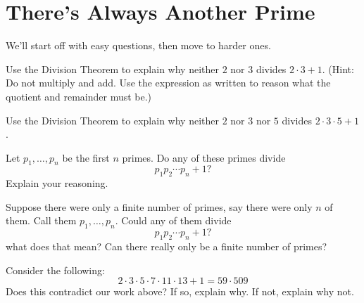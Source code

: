 \newpage
\section{There's Always Another Prime}\label{A:Pr}

We'll start off with easy questions, then move to harder ones.  

\begin{prob}
Use the Division Theorem to explain why neither $2$ nor $3$ divides
$2\cdot 3+1$.  (Hint:  Do not multiply and add.  Use the expression 
as written to reason what the quotient and remainder must be.)
\end{prob}

\begin{prob}
Use the Division Theorem to explain why neither $2$ nor $3$ nor $5$ divides
$2\cdot 3\cdot 5+1$.
\end{prob}

\begin{prob} 
Let $p_1,\dots, p_n$ be the first $n$ primes. Do any of these primes divide 
\[
p_1p_2\cdots p_n + 1?
\]
Explain your reasoning.
\end{prob}


\begin{prob} 
Suppose there were only a finite number of primes, say there were only
$n$ of them. Call them $p_1,\dots, p_n$. Could any of them divide
\[
p_1p_2\cdots p_n + 1?
\]
what does that mean? Can there really only be a finite number of
primes?
\end{prob}


\begin{prob} 
Consider the following:
\[
2\cdot 3\cdot 5\cdot 7 \cdot 11\cdot 13 + 1 = 59\cdot 509
\] 
Does this contradict our work above? If so, explain why. If not, explain
why not.
\end{prob}


